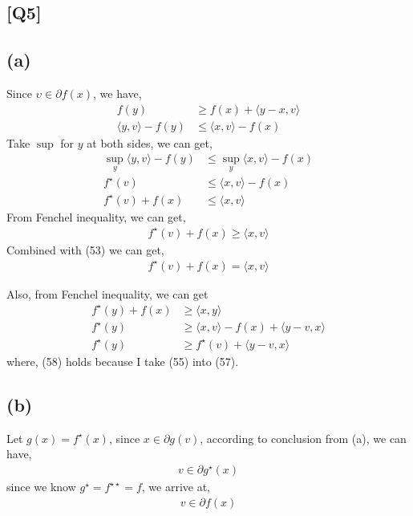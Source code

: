 \documentclass[12pt, a4 paper]{article}
\begin{document}
    \begin{framed}
        \section{[Q5]}
        \subsection{(a)}
        Since $\upsilon \in \partial f(x)$, we have,
        \begin{align}
            f(y) &\geq f(x) + \langle y-x,v \rangle\\
            \langle y,v \rangle - f(y) &\leq \langle x,v \rangle - f(x)
        \end{align}
        \indent Take $\sup$ for $y$ at both sides, we can get,
        \begin{align}
            \sup\limits_{y} \langle y,v \rangle - f(y) &\leq 
            \sup\limits_{y} \langle x,v \rangle - f(x)\\
            f^{\star}(v) &\leq \langle x,v \rangle -f(x)\\
            f^{\star}(v) + f(x) &\leq \langle x,v \rangle
        \end{align}
        \indent From Fenchel inequality, we can get,
        \begin{align}
            f^{\star}(v) + f(x) \geq \langle x,v \rangle
        \end{align}
        \indent Combined with (53) we can get,
        \begin{align}
            f^{\star}(v) + f(x) = \langle x,v \rangle
        \end{align}

        \indent Also, from Fenchel inequality, we can get
        \begin{align}
            f^{\star}(y) + f(x) &\geq \langle x,y \rangle\\
            f^{\star}(y) &\geq \langle x,v \rangle - f(x) + 
            \langle y-v, x \rangle\\
            f^{\star}(y) &\geq f^{\star}(v) + \langle y-v, x\rangle
        \end{align}
        \indent where, (58) holds because I take (55) into (57).


        \subsection{(b)}
        Let $g(x)=f^{\star}(x)$, since $x \in \partial g(v)$, according
        to conclusion from (a), we can have,
        \begin{align}
            v \in \partial g^{\star}(x)
        \end{align}
        \indent since we know $g^{\star} = f^{\star \star} = f$, we arrive
        at,
        \begin{align}
            v \in \partial f(x)
        \end{align}

    \end{framed}
\end{document}
